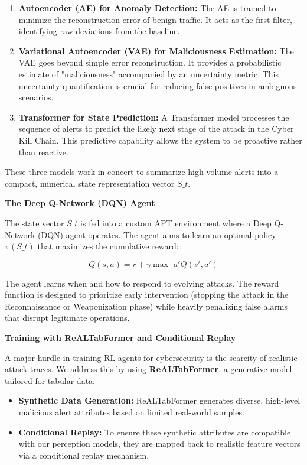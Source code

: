\begin{enumerate}
\item \textbf{Autoencoder (AE) for Anomaly Detection:} The AE is trained to minimize the reconstruction error of benign traffic. It acts as the first filter, identifying raw deviations from the baseline.
\item \textbf{Variational Autoencoder (VAE) for Maliciousness Estimation:} The VAE goes beyond simple error reconstruction. It provides a probabilistic estimate of "maliciousness" accompanied by an uncertainty metric. This uncertainty quantification is crucial for reducing false positives in ambiguous scenarios.
\item \textbf{Transformer for State Prediction:} A Transformer model processes the sequence of alerts to predict the likely next stage of the attack in the Cyber Kill Chain. This predictive capability allows the system to be proactive rather than reactive.
\end{enumerate}

These three models work in concert to summarize high-volume alerts into a compact, numerical state representation vector \(S\_t\).

\textbf{The Deep Q-Network (DQN) Agent}

The state vector \(S\_t\) is fed into a custom APT environment where a Deep Q-Network (DQN) agent operates. The agent aims to learn an optimal policy \(\pi(S\_t)\) that maximizes the cumulative reward:

\[Q(s, a) = r + \gamma \max\_{a'} Q(s', a')\]

The agent learns when and how to respond to evolving attacks. The reward function is designed to prioritize early intervention (stopping the attack in the Reconnaissance or Weaponization phase) while heavily penalizing false alarms that disrupt legitimate operations.

\textbf{Training with ReALTabFormer and Conditional Replay}

A major hurdle in training RL agents for cybersecurity is the scarcity of realistic attack traces. We address this by using \textbf{ReALTabFormer}, a generative model tailored for tabular data.

\begin{itemize}
\item \textbf{Synthetic Data Generation:} ReALTabFormer generates diverse, high-level malicious alert attributes based on limited real-world samples.
\item \textbf{Conditional Replay:} To ensure these synthetic attributes are compatible with our perception models, they are mapped back to realistic feature vectors via a conditional replay mechanism.
\end{itemize}

